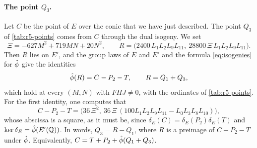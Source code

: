 \paragraph{The point $Q_3$.} Let $C$ be the point of $E$ over the conic that we have just described. The point $Q_3$ of \cref{tab:r5-points} comes from $C$ through the dual isogeny. We set
\[
\Xi=-627M^2+719MN+20N^2,\qquad R=\bigl(2400\,L_1L_2L_9L_{11},\ 28800\,\Xi\,L_1L_2L_9L_{11}\bigr).
\]
Then $R$ lies on $E'$, and the group laws of $E$ and $E'$ and the formula \eqref{eq:isogenies} for $\hat\phi$ give the identities
\begin{equation}\label{r5o:Q3}
\hat\phi(R)=C-P_2-T,\qquad R=Q_1+Q_3,
\end{equation}
which hold at every $(M,N)$ with $FHJ\ne0$, with the ordinates of \cref{tab:r5-points}. For the first identity, one computes that
\[
C-P_2-T=\bigl(36\,\Xi^2,\ 36\,\Xi\,(100L_1L_2L_9L_{11}-L_0L_3L_8L_{10})\bigr),
\]
whose abscissa is a square, as it must be, since $\delta_E(C)=\delta_E(P_2)\delta_E(T)$ and $\ker\delta_E=\hat\phi(E'(\mathbb Q))$. In words, $Q_3=R-Q_1$, where $R$ is a preimage of $C-P_2-T$ under $\hat\phi$. Equivalently, $C=T+P_2+\hat\phi(Q_1+Q_3)$.
